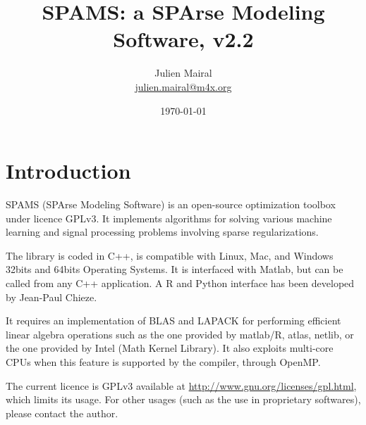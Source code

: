 \documentclass[a4paper, 11pt]{article}
\title{SPAMS: a SPArse Modeling Software, v2.2}
\date{\today}
\author{Julien Mairal \\
\url{julien.mairal@m4x.org}}
\begin{document}
\maketitle

\section{Introduction}
SPAMS (SPArse Modeling Software) is an open-source optimization toolbox under
licence GPLv3.  It implements algorithms for solving various machine learning
and signal processing problems involving sparse regularizations.

The library is coded in C++, is compatible with Linux, Mac, and Windows 32bits
and 64bits Operating Systems. It is interfaced with Matlab, but can be called
from any C++ application. A R and Python interface has been developed by
Jean-Paul Chieze.

It requires an implementation of BLAS and LAPACK for performing efficient
linear algebra operations such as the one provided by matlab/R, atlas, netlib,
or the one provided by Intel (Math Kernel Library).  It also exploits
multi-core CPUs when this feature is supported by the compiler, through
OpenMP.

The current licence is GPLv3 available at
\url{http://www.gnu.org/licenses/gpl.html}, which limits its usage.  For other
usages (such as the use in proprietary softwares), please contact the author.
\end{document}
